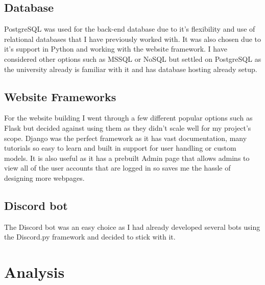 \subsection{Database}
PostgreSQL \cite{psql} was used for the back-end database due to it's flexibility and use of  relational databases that I have previously worked with. It was also chosen due to it's support in Python and working with the website framework. I have considered other options such as MSSQL or NoSQL but settled on PostgreSQL as the university already is familiar with it and has database hosting already setup.

\subsection{Website Frameworks}
For the website building I went through a few different popular options such as Flask but decided against using them as they didn't scale well for my project's scope. Django \cite{Django} was the perfect framework as it has vast documentation, many tutorials so easy to learn and built in support for user handling or custom models. It is also useful as it has a prebuilt Admin page that allows admins to view all of the user accounts that are logged in so saves me the hassle of designing more webpages.

\subsection{Discord bot}
The Discord bot was an easy choice as I had already developed several bots using the Discord.py \cite{discord.py} framework and decided to stick with it.

\section{Analysis}
%
%
%

